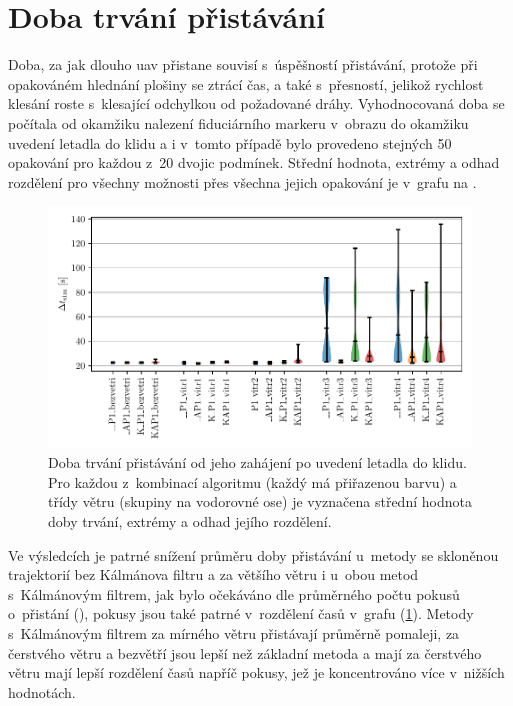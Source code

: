   \section{Doba trvání přistávání}
    Doba, za jak dlouho \acrshort{uav} přistane souvisí s~úspěšností přistávání, protože při opakováném hlednání plošiny se ztrácí čas, a také s~přesností, jelikož rychlost klesání roste s~klesající odchylkou od požadované dráhy. Vyhodnocovaná doba se počítala od okamžiku nalezení fiduciárního markeru v~obrazu do okamžiku uvedení letadla do klidu a i v~tomto případě bylo provedeno stejných 50 opakování pro každou z~20 dvojic podmínek. Střední hodnota, extrémy a odhad rozdělení pro všechny možnosti přes všechna jejich opakování je v~grafu na .

    \begin{figure}[H]
      \centering
      \includegraphics[width=\textwidth]{img/results/trvani.pdf}
      \caption[Doba trvání přistávání]{Doba trvání přistávání od jeho zahájení po uvedení letadla do klidu. Pro každou z~kombinací algoritmu (každý má přiřazenou barvu) a třídy větru (skupiny na vodorovné ose) je vyznačena střední hodnota doby trvání, extrémy a odhad jejího rozdělení.}
      \label{fig:dobaPristavani}
    \end{figure}

    Ve výsledcích je patrné snížení průměru doby přistávání u~metody se skloněnou trajektorií bez Kálmánova filtru a za většího větru i u~obou metod s~Kálmánovým filtrem, jak bylo očekáváno dle průměrného počtu pokusů o~přistání (), pokusy jsou také patrné v~rozdělení časů v~grafu (\cref{fig:dobaPristavani}). Metody s~Kálmánovým filtrem za mírného větru přistávají průměrně pomaleji, za čerstvého větru a bezvětří jsou lepší než základní metoda a mají za čerstvého větru mají lepší rozdělení časů napříč pokusy, jež je koncentrováno více v~nižších hodnotách.
    

